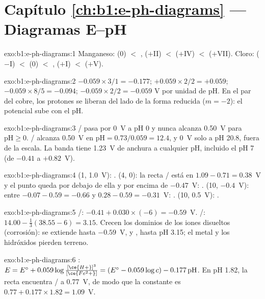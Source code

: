 \section*{Capítulo \ref{ch:b1:e-ph-diagrams} --- Diagramas E--pH}

\begin{solution}{exo:b1:e-ph-diagrams:1}
Manganeso:  (0) $<$ ,  ($+$II) $<$ 
($+$IV) $<$  ($+$VII). Cloro:  ($-$I) $<$  (0)
$<$ ,  ($+$I) $<$  ($+$V).
\end{solution}

\begin{solution}{exo:b1:e-ph-diagrams:2}
$-0.059 \times 3/1 = -0.177$; $+0.059 \times 2/2 = +0.059$;
$-0.059 \times 8/5 = -0.094$; $-0.059 \times 2/2 = -0.059$ V por unidad de
pH. En el par del cobre, los protones se liberan del lado de la forma
reducida ($m = -2$): el potencial sube con el pH.
\end{solution}

\begin{solution}{exo:b1:e-ph-diagrams:3}
/ pasa por 0~V a pH 0 y nunca alcanza 0.50~V para
$\mathrm{pH} \geqslant 0$. / alcanza 0.50~V en
$\mathrm{pH} = 0.73/0.059 = 12.4$, y 0~V solo a pH 20.8, fuera de la
escala. La banda tiene \qty{1.23}{V} de anchura a cualquier pH, incluido
el pH 7 (de $-0.41$ a $+0.82$~V).
\end{solution}

\begin{solution}{exo:b1:e-ph-diagrams:4}
(1, 1.0~V): . (4, 0): la recta / está en
$1.09 - 0.71 = 0.38$~V y el punto queda por debajo de ella y por encima
de $-0.47$~V:
. (10, $-0.4$~V): entre $-0.07 - 0.59 = -0.66$ y $0.28 -
0.59 = -0.31$~V: . (10, 0.5~V): .
\end{solution}

\begin{solution}{exo:b1:e-ph-diagrams:5}
/: $-0.41 + 0.030 \times (-6) = -0.59$~V.
/: $14.00 - \frac13(38.55 - 6) = 3.15$. Crecen los
dominios de los iones disueltos (corrosión):  se extiende hasta
$-0.59$~V, y , hasta pH 3.15; el metal y los hidróxidos pierden
terreno.
\end{solution}

\begin{solution}{exo:b1:e-ph-diagrams:6}
: $E = E^\circ + 0.059\log\frac{[\ce{H+}]^3}{[\ce{Fe^2+}]}
= (E^\circ - 0.059\log c) - 0.177\,\mathrm{pH}$. En pH 1.82, la recta
encuentra / a 0.77~V, de modo que la constante es
$0.77 + 0.177 \times 1.82
= 1.09$~V.
\end{solution}

